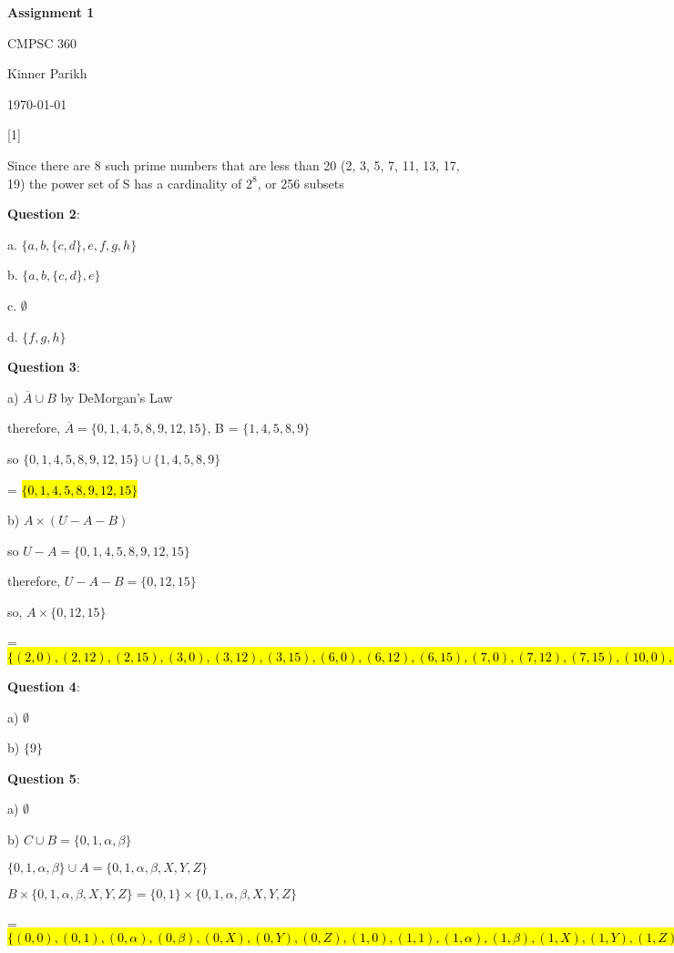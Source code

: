 \documentclass{article} %
\newcommand{\question}[2][]{\begin{flushleft}
        \textbf{Question #1}: \textit{#2}

\end{flushleft}}
\newcommand\tab[1][0.4cm]{\hspace*{#1}}
\newcommand{\maketitletwo}[2][]{\begin{center}
        \Large{\textbf{Assignment #1}
            
            CMPSC 360} %
        \vspace{5pt}
        
        \normalsize{Kinner Parikh  %
        
        \today}        %
        \vspace{15pt}
        
\end{center}}
\begin{document}
    \maketitletwo[1]  %
    
    \question[1]{} 
    
    Since there are 8 such prime numbers that are less than 20 (2, 3, 5, 7, 11, 13, 17, 19) the power set of S has a cardinality of $2^8$, or 256 subsets
    
    \question[2]{}
    
    a. $\{ a, b, \{c, d\}, e, f, g, h \}$

    b. $\{ a, b, \{c, d\}, e \}$

    c. $\emptyset$
    
    d. $\{ f, g, h \}$
    
    
    \question[3]{}

    a) $\overline{A} \cup B$ by DeMorgan's Law

    \tab therefore, $\overline{A} = \{0, 1, 4, 5, 8, 9, 12, 15 \}$, B = $\{ 1, 4, 5, 8, 9 \}$

    \tab so $\{0, 1, 4, 5, 8, 9, 12, 15 \} \cup \{ 1, 4, 5, 8, 9 \}$

    \tab = \hl{$\{ 0, 1, 4, 5, 8, 9, 12, 15 \}$}

    b) $A\times(U - A - B)$

    \tab so $U - A = \{0, 1, 4, 5, 8, 9, 12, 15 \}$

    \tab therefore, $U - A - B = \{ 0, 12, 15 \}$

    \tab so, $A \times \{ 0, 12, 15 \}$ 

    \tab = \hl{$\{(2,0), (2,12), (2,15), (3,0), (3,12), (3,15), (6,0), (6,12), 
    (6,15), (7,0), (7,12), (7,15), (10,0), (10,12), (10,15)\}$}

    \question[4]{}

    a) $\emptyset$

    b) $\{ 9 \}$

    \question[5]{}

    a) $\emptyset$

    b) $C \cup B = \{ 0, 1, \alpha, \beta \}$

    \tab $\{ 0, 1, \alpha, \beta \} \cup A = \{0, 1, \alpha, \beta, X, Y, Z \}$
    
    \tab $B \times \{0, 1, \alpha, \beta, X, Y, Z \} = \{0, 1\} \times \{0, 1, \alpha, \beta, X, Y, Z \}$
        
    \tab = \hl{$\{ (0, 0), (0, 1), (0, \alpha), (0, \beta), (0, X), (0, Y), (0, Z), (1, 0), (1, 1), (1, \alpha), (1, \beta), (1, X), (1, Y), (1, Z)\}$}
\end{document}
